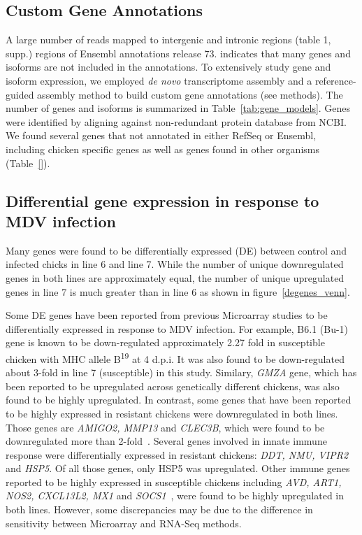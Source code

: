 \documentclass[10pt]{article}
\begin{document}
\subsection*{Custom Gene Annotations}
A large number of reads mapped to intergenic and intronic regions (table 1, supp.)
regions of Ensembl annotations release 73.
indicates that many genes and isoforms are not included in the annotations.
To extensively study gene and isoform expression, we employed \textit{de novo}
transcriptome assembly and a reference-guided assembly method to build
custom gene annotations (see methods).
The number of genes and isoforms is summarized in Table~\ref{tab:gene_models}.
Genes were identified by aligning against non-redundant protein database from NCBI.
We found several genes that not annotated in either RefSeq or Ensembl, including chicken specific genes
as well as genes found in other organisms (Table~\ref{}).


\subsection*{Differential gene expression in response to MDV infection}

Many genes were found to be differentially expressed (DE) between control and infected
chicks in line 6 and line 7.
While the number of unique downregulated genes in both lines are approximately equal,
the number of unique upregulated genes in line 7 is much greater than in line 6 as shown
in figure~\ref{degenes_venn}.

Some DE genes have been reported from previous Microarray studies to be differentially expressed
in response to MDV infection.
For example, B6.1 (Bu-1) gene is known to be down-regulated approximately 2.27 fold in susceptible
chicken with MHC allele B\textsuperscript{19} at 4 d.p.i.
It was also found to be down-regulated about 3-fold in line 7 (susceptible) in this study.
Similary, \textit{GMZA} gene, which has been reported to be upregulated across genetically different chickens,
was also found to be highly upregulated.
In contrast, some genes that have been reported to be highly expressed in resistant chickens were
downregulated in both lines. Those genes are \textit{AMIGO2, MMP13} and \textit{CLEC3B}, which were
found to be downregulated more than 2-fold~\cite{sarson2008transcriptional}.
Several genes involved in innate immune response were differentially expressed in resistant chickens:
\textit{DDT, NMU, VIPR2} and \textit{HSP5}. Of all those genes, only HSP5 was upregulated.
Other immune genes reported to be highly expressed in susceptible chickens including
\textit{AVD, ART1, NOS2, CXCL13L2, MX1} and \textit{SOCS1}~\cite{kaiser2003differential},
were found to be highly upregulated in both lines.
However, some discrepancies may be due to the difference in sensitivity between
Microarray and RNA-Seq methods.
\end{document}
